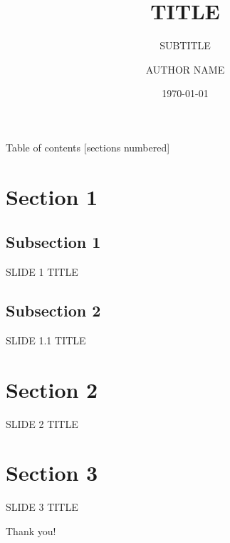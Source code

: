 \documentclass[10pt,xcolor={dvipsnames},aspectratio=169]{beamer}
\title{TITLE}
\subtitle{SUBTITLE}
\date{\today}
\author{AUTHOR NAME}
\institute{INSTITUTE}
\begin{document}
\maketitle

\begin{frame}{Table of contents}
  [sections numbered]
  \tableofcontents%
\end{frame}

\section{Section 1}

\subsection{Subsection 1}

\begin{frame}{SLIDE 1 TITLE}
\end{frame}

\subsection{Subsection 2}

\begin{frame}{SLIDE 1.1 TITLE}
\end{frame}

\section{Section 2}

\begin{frame}{SLIDE 2 TITLE}
\end{frame}

\section{Section 3}

\begin{frame}{SLIDE 3 TITLE}
\end{frame}

\begin{frame}[standout]
Thank you!
\end{frame}



%  

\end{document}
